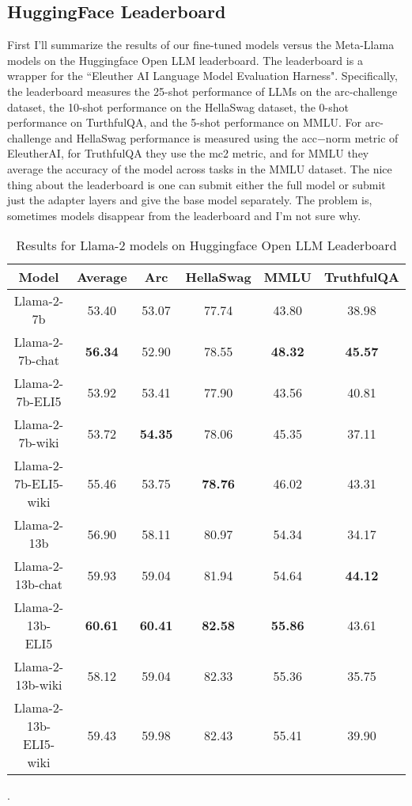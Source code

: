 \documentclass[11pt, oneside]{article}   	%
\begin{document}
\subsection{HuggingFace Leaderboard}
First I'll summarize the results of our fine-tuned models versus the Meta-Llama models on the Huggingface Open LLM leaderboard.
The leaderboard is a wrapper for the ``Eleuther AI Language Model Evaluation Harness". 
Specifically, the leaderboard measures the 25-shot performance of LLMs on the arc-challenge dataset, the 10-shot performance on the HellaSwag dataset, the 0-shot performance on TurthfulQA, and the 5-shot performance on MMLU. For arc-challenge and HellaSwag performance is measured using the acc$-$norm metric of EleutherAI, for TruthfulQA they use the mc2 metric, and for MMLU they average the accuracy of the model across tasks in the MMLU dataset.
The nice thing about the leaderboard is one can submit either the full model or submit just the adapter layers and give the base model separately.
The problem is, sometimes models disappear from the leaderboard and I'm not sure why.
\begin{table}
\begin{center}
\begin{tabular}{|c|c|c|c|c|c|}
\hline
Model &          Average & Arc & HellaSwag & MMLU & TruthfulQA \\
\hline
Llama-2-7b&                  53.40               &   53.07            & 77.74              &  43.80                &  38.98 \\
Llama-2-7b-chat  &          \textbf{56.34} &  52.90              & 78.55             &  \textbf{48.32}    &  \textbf{45.57} \\
Llama-2-7b-ELI5  &           53.92             &  53.41              & 77.90             &  43.56                 & 40.81\\
Llama-2-7b-wiki &           53.72              &  \textbf{54.35} & 78.06             &  45.35                 & 37.11\\
Llama-2-7b-ELI5-wiki&    55.46               &  53.75              & \textbf{78.76}&  46.02                   & 43.31\\
\hhline{|=|=|=|=|=|=|}
Llama-2-13b &               56.90              &   58.11             & 80.97            &  54.34            & 34.17\\
Llama-2-13b-chat&        59.93              & 59.04               & 81.94            &  54.64            & \textbf{44.12}\\
Llama-2-13b-ELI5&          \textbf{60.61} &  \textbf{60.41}  & \textbf{82.58}&  \textbf{55.86}& 43.61\\
Llama-2-13b-wiki&	        58.12             &  59.04               & 82.33            &  55.36            & 35.75\\
Llama-2-13b-ELI5-wiki&   59.43             &  59.98               & 82.43            &  55.41            & 39.90 \\
\hline
\end{tabular}
\end{center}
\caption{Results for Llama-2 models on Huggingface Open LLM Leaderboard}.
\label{table:hfleaderboard}
\end{table}
\end{document}
